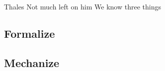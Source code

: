 \documentclass[twoside]{article}
\begin{document}
Thales
Not much left on him
We know three things

\subsection{Formalize}

\subsection{Mechanize}

\sectj

 
\end{document}
